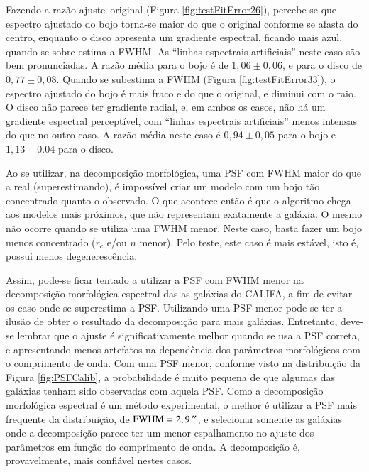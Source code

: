 Fazendo a razão ajuste--original (Figura \ref{fig:testFitError26}), percebe-se
que espectro ajustado do bojo torna-se maior do que o original conforme se
afasta do centro, enquanto o disco apresenta um gradiente espectral, ficando
mais azul, quando se sobre-estima a FWHM. As ``linhas espectrais artificiais''
neste caso são bem pronunciadas. A razão média para o bojo é de $1,06 \pm 0,06$,
e para o disco de $0,77 \pm 0,08$. Quando se subestima a FWHM (Figura
\ref{fig:testFitError33}), o espectro ajustado do bojo é mais fraco e do que o
original, e diminui com o raio. O disco não parece ter gradiente radial, e, em
ambos os casos, não há um gradiente espectral perceptível, com ``linhas
espectrais artificiais'' menos intensas do que no outro caso. A razão média
neste caso é $0,94 \pm 0,05$ para o bojo e $1,13 \pm 0.04$ para o disco.

Ao se utilizar, na decomposição morfológica, uma PSF com FWHM maior do que a
real (superestimando), é impossível criar um modelo com um bojo tão concentrado
quanto o observado. O que acontece então é que o algoritmo chega aos modelos
mais próximos, que não representam exatamente a galáxia. O mesmo não ocorre
quando se utiliza uma FWHM menor. Neste caso, basta fazer um bojo menos
concentrado ($r_e$ e/ou $n$ menor). Pelo teste, este caso é mais estável, isto
é, possui menos degenerescência.

Assim, pode-se ficar tentado a utilizar a PSF com FWHM menor na decomposição
morfológica espectral das as galáxias do CALIFA, a fim de evitar os caso onde se
superestima a PSF. Utilizando uma PSF menor pode-se ter a ilusão de obter o
resultado da decomposição para mais galáxias. Entretanto, deve-se lembrar que o
ajuste é significativamente melhor quando se usa a PSF correta, e apresentando
menos artefatos na dependência dos parâmetros morfológicos com o comprimento de
onda. Com uma PSF menor, conforme visto na distribuição da Figura
\ref{fig:PSFCalib}, a probabilidade é muito pequena de que algumas das galáxias
tenham sido observadas com aquela PSF. Como a decomposição morfológica espectral
é um método experimental, o melhor é utilizar a PSF mais frequente da
distribuição, de $\mathrm{FWHM} = 2,9\,^{\prime\prime}$, e selecionar somente as galáxias
onde a decomposição parece ter um menor espalhamento no ajuste dos parâmetros em
função do comprimento de onda. A decomposição é, provavelmente, mais confiável
nestes casos.



